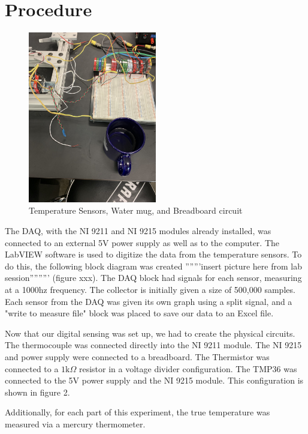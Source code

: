 \documentclass{article}
\begin{document}
\section{Procedure}
\begin{figure}[H]
\centering
\includegraphics[width=0.5\textwidth, angle = -90]{lab2images/circuit_board_mug_and_sensors.jpg}
\caption{Temperature Sensors, Water mug, and Breadboard circuit}
\end{figure}

The DAQ, with the NI 9211 and NI 9215 modules already installed, was connected to an external 5V power supply as well as to the computer.  The LabVIEW software is used to digitize the data from the temperature sensors.  To do this, the following block diagram was created '''''''insert picture here from lab session''''''''' (figure xxx).    The DAQ block had signals for each sensor, measuring at a 1000hz frequency.  The collector is initially given a size of 500,000 samples.  Each sensor from the DAQ was given its own graph using a split signal, and a "write to measure file" block was placed to save our data to an Excel file.  

Now that our digital sensing was set up, we had to create the physical circuits. The thermocouple was connected directly into the NI 9211 module.  The NI 9215 and power supply were connected to a breadboard. 
 The Thermistor was connected to a $1\text{k}\Omega$ resistor in a voltage divider configuration. The TMP36 was connected to the 5V power supply and the NI 9215 module.  This configuration is shown in figure 2.

 Additionally, for each part of this experiment, the true temperature was measured via a mercury thermometer.
\end{document}
